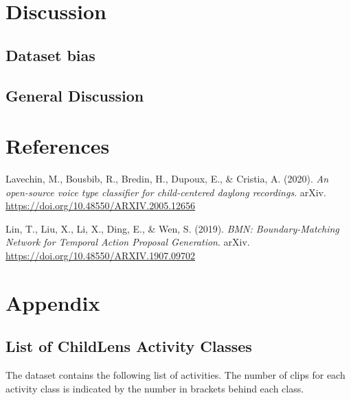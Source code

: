 \documentclass[
  man,floatsintext]{apa6}
\newlength{\cslhangindent}
\newenvironment{CSLReferences}[2] %
 {\begin{list}{}{%
  \setlength{\itemindent}{0pt}
  \setlength{\leftmargin}{0pt}
  \setlength{\parsep}{0pt}
  \ifodd #1
   \setlength{\leftmargin}{\cslhangindent}
   \setlength{\itemindent}{-1\cslhangindent}
  \fi
  \setlength{\itemsep}{#2\baselineskip}}}
 {\end{list}}
\begin{document}
\section{Discussion}\label{discussion}

\subsection{Dataset bias}\label{dataset-bias}

\subsection{General Discussion}\label{general-discussion}

\newpage

\section{References}\label{references}

\begingroup
\setlength{\parindent}{-0.5in}
\setlength{\leftskip}{0.5in}

\label{refs}
\begin{CSLReferences}{1}{0}
Lavechin, M., Bousbib, R., Bredin, H., Dupoux, E., \& Cristia, A. (2020). \emph{An open-source voice type classifier for child-centered daylong recordings}. arXiv. \url{https://doi.org/10.48550/ARXIV.2005.12656}

Lin, T., Liu, X., Li, X., Ding, E., \& Wen, S. (2019). \emph{{BMN}: {Boundary-Matching Network} for {Temporal Action Proposal Generation}}. arXiv. \url{https://doi.org/10.48550/ARXIV.1907.09702}

\end{CSLReferences}

\endgroup

\newpage

\section{Appendix}\label{appendix}

\subsection{List of ChildLens Activity Classes}\label{list-of-childlens-activity-classes}

The dataset contains the following list of activities. The number of clips for each activity class is indicated by the number in brackets behind each class.
\end{document}
